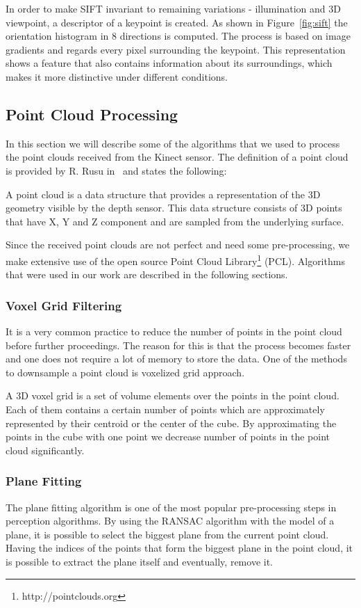 In order to make SIFT invariant to remaining variations - illumination and 3D viewpoint, a descriptor of a keypoint is created. As shown in Figure~\ref{fig:sift} the orientation histogram in 8 directions is computed. The process is based on image gradients and regards every pixel surrounding the keypoint. This representation shows a feature that also contains information about its surroundings, which makes it more distinctive under different conditions.


\subsection{Point Cloud Processing}
In this section we will describe some of the algorithms that we used to process the point clouds received from the Kinect sensor. The definition of a point cloud is provided by R. Rusu in~\cite{Rusu_ICRA2011_PCL} and states the following:

A point cloud is a data structure that provides a representation of the 3D geometry visible by the depth sensor. This data structure consists of 3D points that have X, Y and Z component and are sampled from the underlying surface.  

Since the received point clouds are not perfect and need some pre-processing, we make extensive use of the open source Point Cloud Library\footnote{http://pointclouds.org} (PCL). Algorithms that were used in our work are described in the following sections.

\subsubsection{Voxel Grid Filtering}
It is a very common practice to reduce the number of points in the point cloud before further proceedings. The reason for this is that the process becomes faster and one does not require a lot of memory to store the data. One of the methods to downsample a point cloud is voxelized grid approach.

A 3D voxel grid is a set of volume elements over the points in the point cloud. Each of them contains a certain number of points which are approximately represented by their centroid or the center of the cube. By approximating the points in the cube with one point we decrease number of points in the point cloud significantly. 

\subsubsection{Plane Fitting}
The plane fitting algorithm is one of the most popular pre-processing steps in perception algorithms. By using the RANSAC algorithm with the model of a plane, it is possible to select the biggest plane from the current point cloud. Having the indices of the points that form the biggest plane in the point cloud, it is possible to extract the plane itself and eventually, remove it. 

